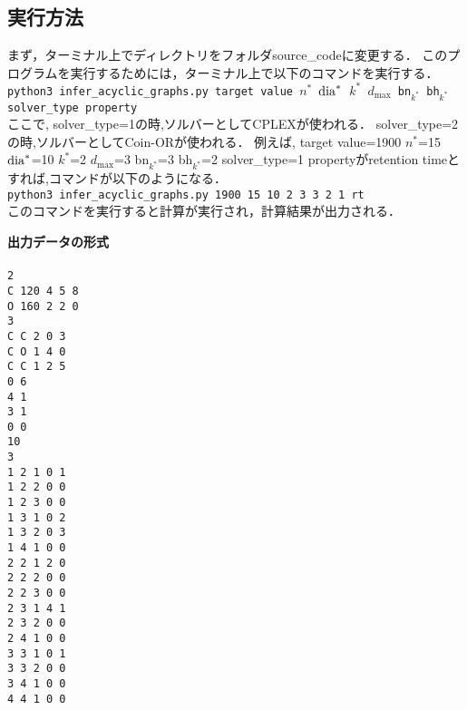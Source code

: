 \documentclass[11pt, titlepage, dvipdfmx, twoside]{article}
\begin{document}
\subsection{実行方法}
\label{sec:Exp_1}

まず，ターミナル上でディレクトリをフォルダsource\_codeに変更する．
このプログラムを実行するためには，ターミナル上で以下のコマンドを実行する．\\

{\tt python3 infer\_acyclic\_graphs.py target value 
$n^\ast$ ${\rm dia}^\ast$ $k^\ast$ $d_{\max}$ bn$_{k^\ast}$  bh$_{k^\ast}$ solver\_type property}\\

ここで, solver\_type=1の時,ソルバーとしてCPLEXが使われる． solver\_type=2の時,ソルバーとしてCoin-ORが使われる．
例えば,
target value=1900 $n^\ast$=15 ${\rm dia}^\ast$=10 $k^\ast$=2 $d_{\max}$=3 bn$_{k^\ast}$=3 bh$_{k^\ast}$=2 solver\_type=1  
propertyがretention timeとすれば,コマンドが以下のようになる．\\

{\tt python3 infer\_acyclic\_graphs.py 1900 15 10 2 3 3 2 1 rt}\\

このコマンドを実行すると計算が実行され，計算結果が出力される．


\begin{oframed}
{\bf 出力データの形式}\\\\
{\tt 2\\
C 120 4 5 8\\
O 160 2 2 0\\
3\\
C C 2 0 3\\
C O 1 4 0\\
C C 1 2 5\\
0 6\\
4 1\\
3 1\\
0 0\\
10\\
3\\
1 2 1 0 1\\
1 2 2 0 0\\
1 2 3 0 0\\
1 3 1 0 2\\
1 3 2 0 3\\
1 4 1 0 0\\
2 2 1 2 0\\
2 2 2 0 0\\
2 2 3 0 0\\
2 3 1 4 1\\
2 3 2 0 0\\
2 4 1 0 0\\
3 3 1 0 1\\
3 3 2 0 0\\
3 4 1 0 0\\
4 4 1 0 0\\}
\end{oframed}
\end{document}
